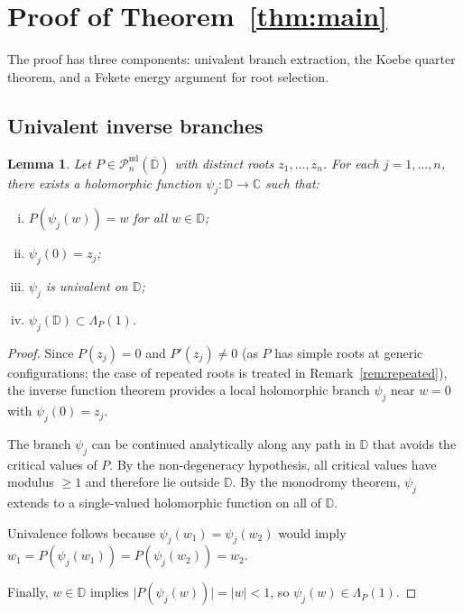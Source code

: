 \documentclass[11pt,a4paper]{amsart}
\newtheorem{lemma}[theorem]{Lemma}
\theoremstyle{definition}
\newcommand{\D}{\mathbb{D}}
\newcommand{\C}{\mathbb{C}}
\newcommand{\Pn}{\mathcal{P}_n}
\newcommand{\abs}[1]{\lvert #1 \rvert}
\begin{document}
\section{Proof of Theorem~\ref{thm:main}}

The proof has three components: univalent branch extraction,
the Koebe quarter theorem, and a Fekete energy argument for root selection.

\subsection{Univalent inverse branches}

\begin{lemma}\label{lem:branch}
Let $P \in \Pn^{\mathrm{nd}}(\overline{\D})$ with distinct roots
$z_1, \ldots, z_n$.  For each $j = 1, \ldots, n$, there exists a
holomorphic function $\psi_j \colon \D \to \C$ such that:
\begin{enumerate}[(i)]
  \item $P(\psi_j(w)) = w$ for all $w \in \D$;
  \item $\psi_j(0) = z_j$;
  \item $\psi_j$ is univalent on $\D$;
  \item $\psi_j(\D) \subset \Lambda_P(1)$.
\end{enumerate}
\end{lemma}

\begin{proof}
Since $P(z_j) = 0$ and $P'(z_j) \neq 0$ (as $P$ has simple roots at
generic configurations; the case of repeated roots is treated in
Remark~\ref{rem:repeated}), the inverse function theorem provides a local
holomorphic branch $\psi_j$ near $w = 0$ with $\psi_j(0) = z_j$.

The branch $\psi_j$ can be continued analytically along any path in $\D$
that avoids the critical values of $P$.  By the non-degeneracy hypothesis,
all critical values have modulus $\geq 1$ and therefore lie outside $\D$.
By the monodromy theorem, $\psi_j$ extends to a single-valued holomorphic
function on all of $\D$.

Univalence follows because $\psi_j(w_1) = \psi_j(w_2)$ would imply
$w_1 = P(\psi_j(w_1)) = P(\psi_j(w_2)) = w_2$.

Finally, $w \in \D$ implies $\abs{P(\psi_j(w))} = \abs{w} < 1$, so
$\psi_j(w) \in \Lambda_P(1)$.
\end{proof}
\end{document}
